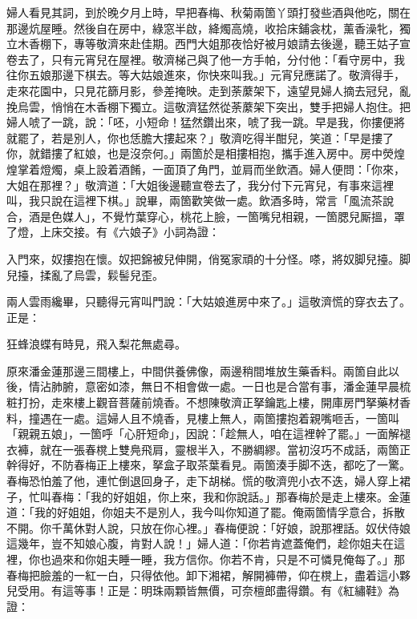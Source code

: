 婦人看見其詞，到於晚夕月上時，早把春梅、秋菊兩箇丫頭打發些酒與他吃，關在那邊炕屋睡。然後自在房中，綠窓半啟，絳燭高燒，收拾床鋪衾枕，薰香澡牝，獨立木香棚下，專等敬濟來赴佳期。西門大姐那夜恰好被月娘請去後邊，聽王姑子宣卷去了，只有元宵兒在屋裡。敬濟梯己與了他一方手帕，分付他：「看守房中，我往你五娘那邊下棋去。等大姑娘進來，你快來叫我。」元宵兒應諾了。敬濟得手，走來花園中，只見花篩月影，參差掩映。走到荼䕷架下，遠望見婦人摘去冠兒，亂挽烏雲，悄悄在木香棚下獨立。這敬濟猛然從荼䕷架下突出，雙手把婦人抱住。把婦人唬了一跳，說：「呸，小短命！猛然鑽出來，唬了我一跳。早是我，你摟便將就罷了，若是別人，你也恁膽大摟起來？」敬濟吃得半酣兒，笑道：「早是摟了你，就錯摟了紅娘，也是沒奈何。」{}兩箇於是相摟相抱，攜手進入房中。房中熒煌煌掌着燈燭，桌上設着酒餚，一面頂了角門，並肩而坐飲酒。婦人便問：「你來，大姐在那裡？」敬濟道：「大姐後邊聽宣卷去了，我分付下元宵兒，有事來這裡叫，我只說在這裡下棋。」說畢，兩箇歡笑做一處。飲酒多時，常言「風流茶說合，酒是色媒人」，不覺竹葉穿心，桃花上臉，一箇嘴兒相親，一箇腮兒厮搵，罩了燈，上床交接。有《六娘子》小詞為證：

\begin{myquote}
入門來，奴摟抱在懷。奴把錦被兒伸開，俏冤家頑的十分怪。嗏，將奴脚兒擡。脚兒擡，揉亂了烏雲，鬏髻兒歪。
\end{myquote}

兩人雲雨纔畢，只聽得元宵叫門說：「大姑娘進房中來了。」這敬濟慌的穿衣去了。正是：

\begin{myquote}
狂蜂浪蝶有時見，飛入梨花無處尋。
\end{myquote}

原來潘金蓮那邊三間樓上，中間供養佛像，兩邊稍間堆放生藥香料。兩箇自此以後，情沾肺腑，意密如漆，無日不相會做一處。一日也是合當有事，潘金蓮早晨梳粧打扮，走來樓上觀音菩薩前燒香。不想陳敬濟正拏鑰匙上樓，開庫房門拏藥材香料，撞遇在一處。這婦人且不燒香，{}見樓上無人，兩箇摟抱着親嘴咂舌，一箇叫「親親五娘」，一箇呼「心肝短命」，{}因說：「趁無人，咱在這裡幹了罷。」一面解褪衣褲，就在一張春櫈上雙鳧飛肩，靈根半入，不勝綢繆。當初沒巧不成話，兩箇正幹得好，不防春梅正上樓來，拏盒子取茶葉看見。兩箇湊手脚不迭，都吃了一驚。春梅恐怕羞了他，連忙倒退回身子，走下胡梯。慌的敬濟兜小衣不迭，婦人穿上裙子，忙叫春梅：「我的好姐姐，你上來，我和你說話。」那春梅於是走上樓來。金蓮道：「我的好姐姐，你姐夫不是別人，我今叫你知道了罷。俺兩箇情孚意合，拆散不開。你千萬休對人說，只放在你心裡。」春梅便說：「好娘，說那裡話。奴伏侍娘這幾年，豈不知娘心腹，肯對人說！」婦人道：「你若肯遮蓋俺們，趁你姐夫在這裡，你也過來和你姐夫睡一睡，我方信你。你若不肯，只是不可憐見俺每了。」那春梅把臉羞的一紅一白，只得依他。卸下湘裙，解開褲帶，仰在櫈上，盡着這小夥兒受用。{}有這等事！正是：明珠兩顆皆無價，可奈檀郎盡得鑽。有《紅繡鞋》為證：

